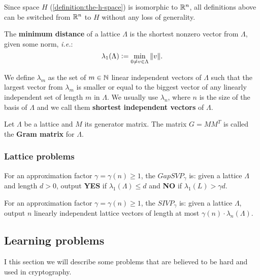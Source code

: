 \documentclass[a4paper,12pt]{article}
\begin{document}
Since space \(H\) (\ref{definition:the-h-space}) is isomorphic to \(\mathbb{R}^n\), all definitions above can be switched from \(\mathbb{R}^n\) to \(H\) without any loss of generality.

\begin{definition}
  The \textbf{minimum distance} of a lattice $\Lambda$ is the shortest nonzero vector
  from $\Lambda$, given some norm, \textit{i.e.}:
  $$
  \lambda_1(\Lambda) \vcentcolon = \min_{0 \ne v \in \Lambda}{\|v\|}.
  $$

  We define $\lambda_m$ as the set of $m \in \mathbb{N}$  linear independent vectors of $\Lambda$
  such that the largest vector from $\lambda_m$ is smaller or equal to the biggest vector of any linearly independent set of length $m$ in $\Lambda$. We usually use
  $\lambda_n$, where $n$ is the size of the basis of $\Lambda$ and we call them
  \textbf{shortest independent vectors} of $\Lambda$.
\end{definition}

\begin{definition}\label{definition:gram-matrix}
  Let $\Lambda$ be a lattice and $M$ its generator matrix. The matrix $G = MM^T$ is called the \textbf{Gram matrix} for $\Lambda$.
\end{definition}
\subsubsection{Lattice problems}
\label{sec:orgfebf343}
    \begin{definition}
  \label{definition:GapSVP-gap-shortest-vector-problem}
For an approximation factor $\gamma  = \gamma(n) \geq 1$, the $GapSVP_\gamma $ is: given a lattice
$\Lambda$ and length $d > 0$, output \textbf{YES} if $\lambda_1(\Lambda) \leq d$ and \textbf{NO} if
$\lambda_1(L) > \gamma d$.  
\end{definition}

\begin{definition}
  \label{definition:SIVP-shortest-independent-vector-problem}
  For an approximation factor $\gamma = \gamma(n) \geq 1$, the $SIVP_\gamma$ is: given a lattice $\Lambda$, output $n$ linearly independent lattice vectors of length at most $\gamma(n) \cdot \lambda_n(\Lambda)$.
\end{definition}
\subsection{Learning problems}
\label{sec:orgedc7f0d}
I this section we will describe some problems that are believed to be hard and used in cryptography. 
\end{document}
